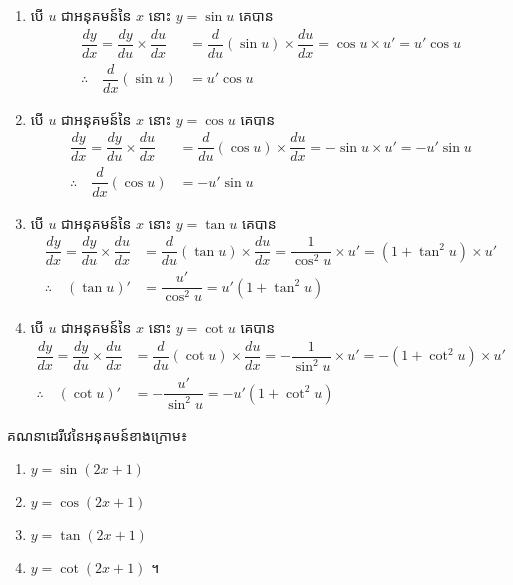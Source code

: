 \documentclass[a4paper,12pt]{article}
\begin{document}
\solution
\begin{enumerate}

	\item បើ $u$ ជាអនុគមន៍នៃ $x$ នោះ $y=\sin u$ គេបាន
	      \begin{align*}
		      \dfrac{dy}{dx}=\dfrac{dy}{du}\times \dfrac{du}{dx} & =\dfrac{d}{du}(\sin u)\times \dfrac{du}{dx}=\cos u \times u'=u'\cos u \\
		      \therefore \quad \dfrac{d}{dx}(\sin u)             & =u'\cos u
	      \end{align*}
	\item បើ $u$ ជាអនុគមន៍នៃ $x$ នោះ $y=\cos u$ គេបាន
	      \begin{align*}
		      \dfrac{dy}{dx}=\dfrac{dy}{du}\times \dfrac{du}{dx} & =\dfrac{d}{du}(\cos u)\times \dfrac{du}{dx}=-\sin u \times u'=-u'\sin u \\
		      \therefore \quad \dfrac{d}{dx}(\cos u)             & =-u'\sin u
	      \end{align*}
	\item បើ $u$ ជាអនុគមន៍នៃ $x$ នោះ $y=\tan u$ គេបាន
	      \begin{align*}
		      \dfrac{dy}{dx}=\dfrac{dy}{du}\times \dfrac{du}{dx} & =\dfrac{d}{du}(\tan u)\times \dfrac{du}{dx}=\dfrac{1}{\cos^2 u} \times u'=(1+\tan^2 u)\times u' \\
		      \therefore \quad (\tan u)'                         & =\dfrac{u'}{\cos^2 u}=u'(1+\tan^2 u)
	      \end{align*}
	\item បើ $u$ ជាអនុគមន៍នៃ $x$ នោះ $y=\cot u$ គេបាន
	      \begin{align*}
		      \dfrac{dy}{dx}=\dfrac{dy}{du}\times \dfrac{du}{dx} & =\dfrac{d}{du}(\cot u)\times \dfrac{du}{dx}=-\dfrac{1}{\sin^2 u} \times u'=-(1+\cot^2 u)\times u' \\
		      \therefore \quad (\cot u)'                         & =-\dfrac{u'}{\sin ^2 u}=-u'(1+\cot^2 u)
	      \end{align*}
\end{enumerate}
\begin{example}
	គណនាដេរីវេនៃអនុគមន៍ខាងក្រោម៖
	\begin{multicols}{2}
		\begin{enumerate}
			\item $y=\sin (2x+1)$
			\item $y=\cos (2x+1)$
			\item $y=\tan (2x+1)$
			\item $y=\cot (2x+1)$ ។
		\end{enumerate}
	\end{multicols}
\end{example}
\end{document}

